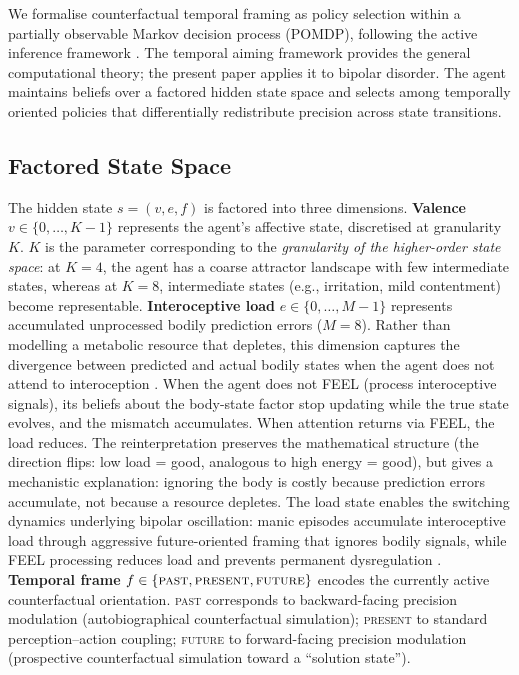 \documentclass[11pt,a4paper]{article}
\begin{document}
We formalise counterfactual temporal framing as policy selection within a partially observable Markov decision process (POMDP), following the active inference framework \citep{parr2022active}. The temporal aiming framework \citep{albarracin2026temporal} provides the general computational theory; the present paper applies it to bipolar disorder. The agent maintains beliefs over a factored hidden state space and selects among temporally oriented policies that differentially redistribute precision across state transitions.

\subsection{Factored State Space}

The hidden state $s = (v, e, f)$ is factored into three dimensions. \textbf{Valence} $v \in \{0, \ldots, K{-}1\}$ represents the agent's affective state, discretised at granularity $K$. $K$ is the parameter corresponding to the \emph{granularity of the higher-order state space}: at $K{=}4$, the agent has a coarse attractor landscape with few intermediate states, whereas at $K{=}8$, intermediate states (e.g., irritation, mild contentment) become representable. \textbf{Interoceptive load} $e \in \{0, \ldots, M{-}1\}$ represents accumulated unprocessed bodily prediction errors ($M{=}8$). Rather than modelling a metabolic resource that depletes, this dimension captures the divergence between predicted and actual bodily states when the agent does not attend to interoception \citep{stephan2016allostatic, seth2016interoceptive}. When the agent does not FEEL (process interoceptive signals), its beliefs about the body-state factor stop updating while the true state evolves, and the mismatch accumulates. When attention returns via FEEL, the load reduces. The reinterpretation preserves the mathematical structure (the direction flips: low load = good, analogous to high energy = good), but gives a mechanistic explanation: ignoring the body is costly because prediction errors accumulate, not because a resource depletes. The load state enables the switching dynamics underlying bipolar oscillation: manic episodes accumulate interoceptive load through aggressive future-oriented framing that ignores bodily signals, while FEEL processing reduces load and prevents permanent dysregulation \citep{pezzulo2015active}. \textbf{Temporal frame} $f \in \{\textsc{past}, \textsc{present}, \textsc{future}\}$ encodes the currently active counterfactual orientation. \textsc{past} corresponds to backward-facing precision modulation (autobiographical counterfactual simulation); \textsc{present} to standard perception--action coupling; \textsc{future} to forward-facing precision modulation (prospective counterfactual simulation toward a ``solution state'').
\end{document}
